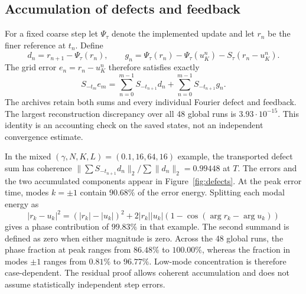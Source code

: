 \documentclass[11pt]{article}
\theoremstyle{remark}\newtheorem{remark}[theorem]{Remark}
\begin{document}
\subsection{Accumulation of defects and feedback}
For a fixed coarse step let $\Psi_\tau$ denote the implemented update
and let $r_n$ be the finer reference at $t_n$. Define
\[
d_n=r_{n+1}-\Psi_\tau(r_n),\qquad
g_n=\Psi_\tau(r_n)-\Psi_\tau(u_K^n)-S_\tau(r_n-u_K^n).
\]
The grid error $e_n=r_n-u_K^n$ therefore satisfies exactly
\[
S_{-t_m}e_m
 =\sum_{n=0}^{m-1}S_{-t_{n+1}}d_n
  +\sum_{n=0}^{m-1}S_{-t_{n+1}}g_n .
\]
The archives retain both sums and every individual Fourier defect and
feedback. The largest reconstruction discrepancy over all 48 global
runs is $3.93\cdot10^{-15}$. This identity is an accounting check on
the saved states, not an independent convergence estimate.

In the mixed $(\gamma,N,K,L)=(0.1,16,64,16)$ example,
the transported defect sum has coherence
$\|\sum S_{-t_{n+1}}d_n\|_2/\sum\|d_n\|_2=0.99448$
at $T$. The errors and the two accumulated components appear in
Figure~\ref{fig:defects}. At the peak error time, modes $k=\pm1$
contain $90.68\%$ of the error energy. Splitting each modal energy as
\[
|r_k-u_k|^2=(|r_k|-|u_k|)^2+
                 2|r_k||u_k|(1-\cos(\arg r_k-\arg u_k))
\]
gives a phase contribution of $99.83\%$ in that example.
The second summand is defined as zero when either magnitude is zero.
Across the 48 global runs, the phase fraction at peak ranges from
$86.48\%$ to $100.00\%$, whereas the fraction in modes $\pm1$ ranges
from $0.81\%$ to $96.77\%$. Low-mode concentration is therefore
case-dependent. The residual proof allows coherent accumulation and
does not assume statistically independent step errors.
\end{document}
